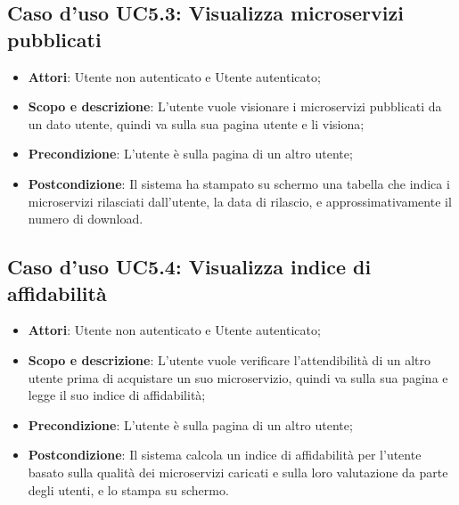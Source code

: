 \documentclass[12pt,a4paper,titlepage]{article}
\begin{document}
	\subsection{Caso d'uso UC5.3: Visualizza microservizi pubblicati}
	\label{UC5.3}
	\begin{itemize}
		\item \textbf{Attori}: Utente non autenticato e Utente autenticato;
		\item \textbf{Scopo e descrizione}: L'utente vuole visionare i microservizi pubblicati da un dato utente, quindi va sulla sua pagina utente e li visiona;
		\item \textbf{Precondizione}: L'utente è sulla pagina di un altro utente;
		\item \textbf{Postcondizione}: Il sistema ha stampato su schermo una tabella che indica i microservizi rilasciati dall'utente, la data di rilascio, e approssimativamente il numero di download.
	\end{itemize}

	\subsection{Caso d'uso UC5.4: Visualizza indice di affidabilità}
	\label{UC5.4}
	\begin{itemize}
		\item \textbf{Attori}: Utente non autenticato e Utente autenticato;
		\item \textbf{Scopo e descrizione}: L'utente vuole verificare l'attendibilità di un altro utente prima di acquistare un suo microservizio, quindi va sulla sua pagina e legge il suo indice di affidabilità;
		\item \textbf{Precondizione}: L'utente è sulla pagina di un altro utente;
		\item \textbf{Postcondizione}: Il sistema calcola un indice di affidabilità per l'utente basato sulla qualità dei microservizi caricati e sulla loro valutazione da parte degli utenti, e lo stampa su schermo.
	\end{itemize}
\end{document}
